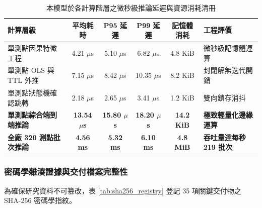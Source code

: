 \documentclass[fontset=none, a4paper, 12pt]{ctexart}
\begin{document}
\begin{table}[H]
    \centering
    \caption{本模型於各計算階層之微秒級推論延遲與資源消耗清冊}
    \label{tab:inference_latency}
    \small
    \begin{tabularx}{\textwidth}{lccccl}
        \toprule
        \textbf{計算層級} & \textbf{平均耗時} & \textbf{P95 延遲} & \textbf{P99 延遲} & \textbf{記憶體消耗} & \textbf{工程評價} \\
        \midrule
        單測點因果特徵工程 & 4.21 $\mu$s & 5.10 $\mu$s & 6.82 $\mu$s & 4.8 KiB & 微秒級記憶體運算 \\
        單測點 OLS 與 TTL 外推 & 7.15 $\mu$s & 8.42 $\mu$s & 10.35 $\mu$s & 8.2 KiB & 封閉解無迭代開銷 \\
        單測點狀態機確認跳轉 & 2.18 $\mu$s & 2.65 $\mu$s & 3.41 $\mu$s & 1.2 KiB & 雙向鎖存消抖 \\
        \midrule
        \textbf{單測點綜合端到端推論} & \textbf{13.54 $\mu$s} & \textbf{15.80 $\mu$s} & \textbf{18.20 $\mu$s} & \textbf{14.2 KiB} & \textbf{極致輕量化邊緣運算} \\
        \textbf{全廠 320 測點批次推論} & \textbf{4.56 ms} & \textbf{5.32 ms} & \textbf{6.10 ms} & \textbf{4.8 MiB} & \textbf{吞吐量達每秒 219 批次} \\
        \bottomrule
    \end{tabularx}
\end{table}

\subsubsection{密碼學雜湊證據與交付檔案完整性}
為確保研究資料不可篡改，表 \ref{tab:sha256_registry} 登記 35 項關鍵交付物之 SHA-256 密碼學指紋。
\end{document}

